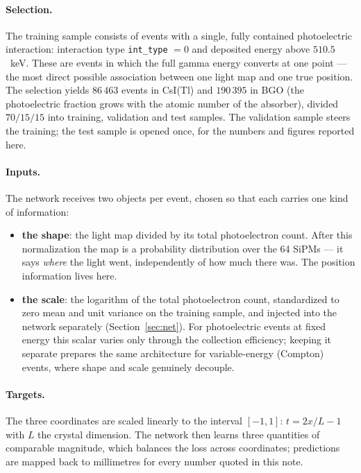\documentclass[11pt,a4paper]{article}
\newcommand{\code}[1]{\texttt{#1}}
\newcommand{\csitl}{CsI(Tl)}
\begin{document}
\paragraph{Selection.} The training sample consists of events with a single,
fully contained photoelectric interaction: interaction type
\code{int\_type} $= 0$ and deposited energy above $510.5$~keV. These are events
in which the full gamma energy converts at one point --- the most direct possible
association between one light map and one true position. The selection yields
$86\,463$ events in \csitl{} and $190\,395$ in BGO (the photoelectric fraction
grows with the atomic number of the absorber), divided $70/15/15$ into
training, validation and test samples. The validation sample steers the
training; the test sample is opened once, for the numbers and figures reported
here.

\paragraph{Inputs.} The network receives two objects per event, chosen so that
each carries one kind of information:
\begin{itemize}
  \item \textbf{the shape}: the light map divided by its total photoelectron
    count. After this normalization the map is a probability distribution over
    the 64 SiPMs --- it says \emph{where} the light went, independently of how
    much there was. The position information lives here.
  \item \textbf{the scale}: the logarithm of the total photoelectron count,
    standardized to zero mean and unit variance on the training sample, and
    injected into the network separately (Section~\ref{sec:net}). For
    photoelectric events at fixed energy this scalar varies only through the
    collection efficiency; keeping it separate prepares the same architecture
    for variable-energy (Compton) events, where shape and scale genuinely
    decouple.
\end{itemize}

\paragraph{Targets.} The three coordinates are scaled linearly to the interval
$[-1, 1]$: $t = 2x/L - 1$ with $L$ the crystal dimension. The network then
learns three quantities of comparable magnitude, which balances the loss
across coordinates; predictions are mapped back to millimetres for every
number quoted in this note.
\end{document}
